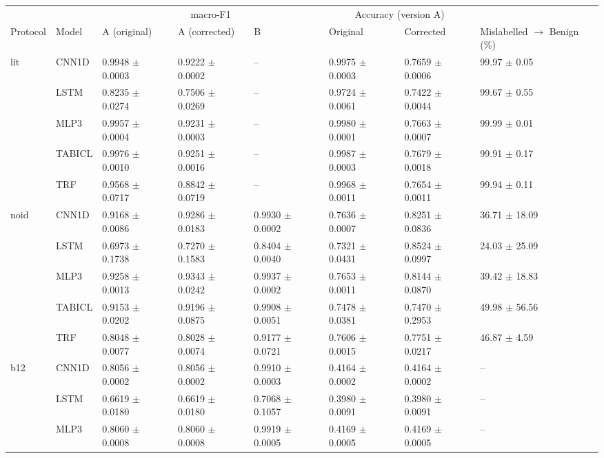 \begin{tabular}{ll lll ll l}
\toprule
& & \multicolumn{3}{c}{macro-F1} & \multicolumn{2}{c}{Accuracy (version A)} & \\
\cmidrule(lr){3-5}\cmidrule(lr){6-7}
Protocol & Model & A (original) & A (corrected) & B & Original & Corrected & Mislabelled $\to$ Benign (\%)\\
\midrule
lit & CNN1D & 0.9948 $\pm$ 0.0003 & 0.9222 $\pm$ 0.0002 & -- & 0.9975 $\pm$ 0.0003 & 0.7659 $\pm$ 0.0006 & 99.97 $\pm$ 0.05\\
 & LSTM & 0.8235 $\pm$ 0.0274 & 0.7506 $\pm$ 0.0269 & -- & 0.9724 $\pm$ 0.0061 & 0.7422 $\pm$ 0.0044 & 99.67 $\pm$ 0.55\\
 & MLP3 & 0.9957 $\pm$ 0.0004 & 0.9231 $\pm$ 0.0003 & -- & 0.9980 $\pm$ 0.0001 & 0.7663 $\pm$ 0.0007 & 99.99 $\pm$ 0.01\\
 & TABICL & 0.9976 $\pm$ 0.0010 & 0.9251 $\pm$ 0.0016 & -- & 0.9987 $\pm$ 0.0003 & 0.7679 $\pm$ 0.0018 & 99.91 $\pm$ 0.17\\
 & TRF & 0.9568 $\pm$ 0.0717 & 0.8842 $\pm$ 0.0719 & -- & 0.9968 $\pm$ 0.0011 & 0.7654 $\pm$ 0.0011 & 99.94 $\pm$ 0.11\\
\midrule
noid & CNN1D & 0.9168 $\pm$ 0.0086 & 0.9286 $\pm$ 0.0183 & 0.9930 $\pm$ 0.0002 & 0.7636 $\pm$ 0.0007 & 0.8251 $\pm$ 0.0836 & 36.71 $\pm$ 18.09\\
 & LSTM & 0.6973 $\pm$ 0.1738 & 0.7270 $\pm$ 0.1583 & 0.8404 $\pm$ 0.0040 & 0.7321 $\pm$ 0.0431 & 0.8524 $\pm$ 0.0997 & 24.03 $\pm$ 25.09\\
 & MLP3 & 0.9258 $\pm$ 0.0013 & 0.9343 $\pm$ 0.0242 & 0.9937 $\pm$ 0.0002 & 0.7653 $\pm$ 0.0011 & 0.8144 $\pm$ 0.0870 & 39.42 $\pm$ 18.83\\
 & TABICL & 0.9153 $\pm$ 0.0202 & 0.9196 $\pm$ 0.0875 & 0.9908 $\pm$ 0.0051 & 0.7478 $\pm$ 0.0381 & 0.7470 $\pm$ 0.2953 & 49.98 $\pm$ 56.56\\
 & TRF & 0.8048 $\pm$ 0.0077 & 0.8028 $\pm$ 0.0074 & 0.9177 $\pm$ 0.0721 & 0.7606 $\pm$ 0.0015 & 0.7751 $\pm$ 0.0217 & 46.87 $\pm$ 4.59\\
\midrule
b12 & CNN1D & 0.8056 $\pm$ 0.0002 & 0.8056 $\pm$ 0.0002 & 0.9910 $\pm$ 0.0003 & 0.4164 $\pm$ 0.0002 & 0.4164 $\pm$ 0.0002 & --\\
 & LSTM & 0.6619 $\pm$ 0.0180 & 0.6619 $\pm$ 0.0180 & 0.7068 $\pm$ 0.1057 & 0.3980 $\pm$ 0.0091 & 0.3980 $\pm$ 0.0091 & --\\
 & MLP3 & 0.8060 $\pm$ 0.0008 & 0.8060 $\pm$ 0.0008 & 0.9919 $\pm$ 0.0005 & 0.4169 $\pm$ 0.0005 & 0.4169 $\pm$ 0.0005 & --\\

\end{tabular}
